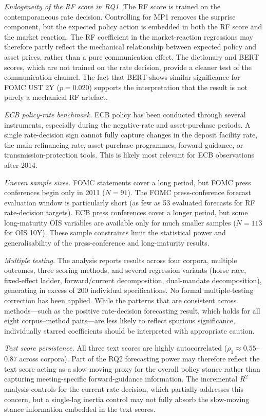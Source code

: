 \emph{Endogeneity of the RF score in RQ1.}
The RF score is trained on the contemporaneous rate decision. Controlling for
MP1 removes the surprise component, but the expected policy action is embedded
in both the RF score and the market reaction. The RF coefficient in the
market-reaction regressions may therefore partly reflect the mechanical
relationship between expected policy and asset prices, rather than a pure
communication effect. The dictionary and BERT scores, which are not
trained on the rate decision, provide a cleaner test of the communication
channel. The fact that BERT shows similar significance for FOMC UST 2Y
($p=0.020$) supports the interpretation that the result is not purely a
mechanical RF artefact.

\emph{ECB policy-rate benchmark.}
ECB policy has been conducted through several instruments, especially during the
negative-rate and asset-purchase periods. A single rate-decision sign cannot
fully capture changes in the deposit facility rate, the main refinancing rate,
asset-purchase programmes, forward guidance, or transmission-protection tools.
This is likely most relevant for ECB observations after 2014.

\emph{Uneven sample sizes.}
FOMC statements cover a long period, but FOMC press conferences begin only in
2011 ($N=91$). The FOMC press-conference forecast evaluation window is
particularly short (as few as 53 evaluated forecasts for RF rate-decision
targets). ECB press conferences cover a longer period, but some long-maturity
OIS variables are available only for much smaller samples ($N=113$ for OIS 10Y).
These sample constraints limit the statistical power and generalisability of the
press-conference and long-maturity results.

\emph{Multiple testing.}
The analysis reports results across four corpora, multiple outcomes, three
scoring methods, and several regression variants (horse race, fixed-effect
ladder, forward/current decomposition, dual-mandate decomposition), generating
in excess of 200 individual specifications. No formal multiple-testing
correction has been applied. While the patterns that are consistent across
methods---such as the positive rate-decision forecasting result, which holds
for all eight corpus--method pairs---are less likely to reflect spurious
significance, individually starred coefficients should be interpreted with
appropriate caution.

\emph{Text score persistence.}
All three text scores are highly autocorrelated ($\rho_1 \approx 0.55$--$0.87$
across corpora). Part of the RQ2 forecasting power may therefore reflect the
text score acting as a slow-moving proxy for the overall policy stance rather
than capturing meeting-specific forward-guidance information. The incremental
$R^2$ analysis controls for the current rate decision, which partially addresses
this concern, but a single-lag inertia control may not fully absorb the
slow-moving stance information embedded in the text scores.

